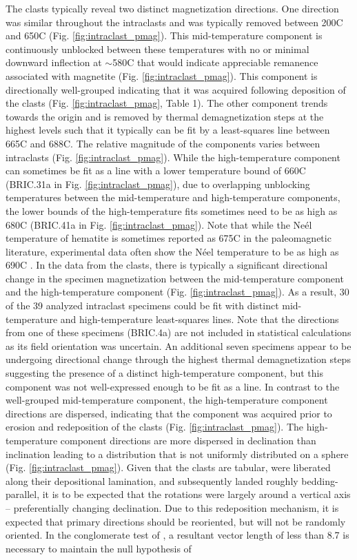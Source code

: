 \documentclass[draft]{agujournal2019}
\begin{document}
The clasts typically reveal two distinct magnetization directions. One direction was similar throughout the intraclasts and was typically removed between 200\textdegree C and 650\textdegree C (Fig. \ref{fig:intraclast_pmag}). This mid-temperature component is continuously unblocked between these temperatures with no or minimal downward inflection at $\sim$580\textdegree C that would indicate appreciable remanence associated with magnetite (Fig. \ref{fig:intraclast_pmag}). This component is directionally well-grouped indicating that it was acquired following deposition of the clasts (Fig. \ref{fig:intraclast_pmag}, Table 1). The other component trends towards the origin and is removed by thermal demagnetization steps at the highest levels such that it typically can be fit by a least-squares line between 665\textdegree C and 688\textdegree C. The relative magnitude of the components varies between intraclasts (Fig. \ref{fig:intraclast_pmag}). While the high-temperature component can sometimes be fit as a line with a lower temperature bound of 660\textdegree C (BRIC.31a in Fig. \ref{fig:intraclast_pmag}), due to overlapping unblocking temperatures between the mid-temperature and high-temperature components, the lower bounds of the high-temperature fits sometimes need to be as high as 680\textdegree C (BRIC.41a in Fig. \ref{fig:intraclast_pmag}). Note that while the Ne\'el temperature of hematite is sometimes reported as 675\textdegree C in the paleomagnetic literature, experimental data often show the N\'eel temperature to be as high as 690\textdegree C \cite{Ozdemir2006a}. In the data from the clasts, there is typically a significant directional change in the specimen magnetization between the mid-temperature component and the high-temperature component (Fig. \ref{fig:intraclast_pmag}). As a result, 30 of the 39 analyzed intraclast specimens could be fit with distinct mid-temperature and high-temperature least-squares lines. Note that the directions from one of these specimens (BRIC.4a) are not included in statistical calculations as its field orientation was uncertain. An additional seven specimens appear to be undergoing directional change through the highest thermal demagnetization steps suggesting the presence of a distinct high-temperature component, but this component was not well-expressed enough to be fit as a line. In contrast to the well-grouped mid-temperature component, the high-temperature component directions are dispersed, indicating that the component was acquired prior to erosion and redeposition of the clasts (Fig. \ref{fig:intraclast_pmag}). The high-temperature component directions are more dispersed in declination than inclination leading to a distribution that is not uniformly distributed on a sphere (Fig. \ref{fig:intraclast_pmag}). Given that the clasts are tabular, were liberated along their depositional lamination, and subsequently landed roughly bedding-parallel, it is to be expected that the rotations were largely around a vertical axis -- preferentially changing declination. Due to this redeposition mechanism, it is expected that primary directions should be reoriented, but will not be randomly oriented. In the conglomerate test of \cite{Watson1956a}, a resultant vector length of less than 8.7 is necessary to maintain the null hypothesis of 
\end{document}
